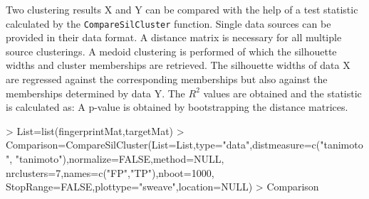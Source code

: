 \documentclass[a4paper]{article}
\begin{document}
\newpage
\noindent Two clustering results X and Y can be compared with the help of a test
statistic calculated by the \texttt{CompareSilCluster} function. Single data
sources can be provided in their data format. A distance matrix is necessary for
all multiple source clusterings. A medoid clustering is performed of which the
silhouette widths and cluster memberships are retrieved. The silhouette widths
of data X are regressed against the corresponding memberships but also against
the memberships determined by data Y. The $R^{2}$ values are obtained and the
statistic is calculated as:
A p-value is obtained by bootstrapping the distance matrices.
\begin{Schunk}
\begin{Sinput}
> List=list(fingerprintMat,targetMat)
> Comparison=CompareSilCluster(List=List,type="data",distmeasure=c("tanimoto",
                              "tanimoto"),normalize=FALSE,method=NULL,
 		                      nrclusters=7,names=c("FP","TP"),nboot=1000,
                               StopRange=FALSE,plottype="sweave",location=NULL)
> Comparison
\end{Sinput}
\end{Schunk}
\end{document}

